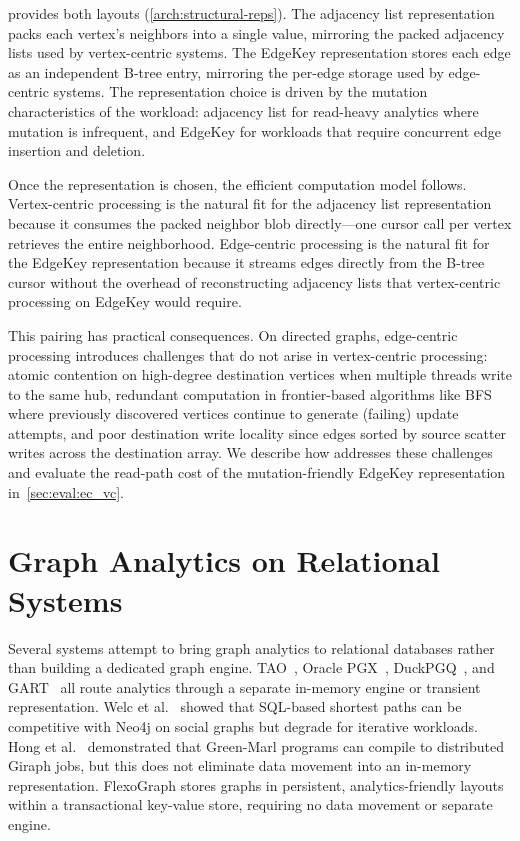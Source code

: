 \project{} provides both layouts (\autoref{arch:structural-reps}).
The adjacency list representation packs each vertex's neighbors into a single \wt{} value, mirroring the packed adjacency lists used by vertex-centric systems.
The EdgeKey representation stores each edge as an independent B-tree entry, mirroring the per-edge storage used by edge-centric systems.
The representation choice is driven by the mutation characteristics of the workload: adjacency list for read-heavy analytics where mutation is infrequent, and EdgeKey for workloads that require concurrent edge insertion and deletion.

Once the representation is chosen, the efficient computation model follows.
Vertex-centric processing is the natural fit for the adjacency list representation because it consumes the packed neighbor blob directly---one cursor call per vertex retrieves the entire neighborhood.
Edge-centric processing is the natural fit for the EdgeKey representation because it streams edges directly from the B-tree cursor without the overhead of reconstructing adjacency lists that vertex-centric processing on EdgeKey would require.

This pairing has practical consequences.
On directed graphs, edge-centric processing introduces challenges that do not arise in vertex-centric processing: atomic contention on high-degree destination vertices when multiple threads write to the same hub, redundant computation in frontier-based algorithms like BFS where previously discovered vertices continue to generate (failing) update attempts, and poor destination write locality since edges sorted by source scatter writes across the destination array.
We describe how \project{} addresses these challenges and evaluate the read-path cost of the mutation-friendly EdgeKey representation in~\autoref{sec:eval:ec_vc}.

\section{Graph Analytics on Relational Systems}
\label{design:relational_analytics}
Several systems attempt to bring graph analytics to relational databases rather than building a dedicated graph engine.
TAO~\cite{bronson2013tao}, Oracle PGX~\cite{hong2015pgx,OraclePG,WhatIsOracleSpatialGraph:online}, DuckPGQ~\cite{duckpgq:online}, and GART~\cite{shen2023bridging} all route analytics through a separate in-memory engine or transient representation.
Welc et al.~\cite{welc2013graph,graphProcessingRDBMS} showed that SQL-based shortest paths can be competitive with Neo4j on social graphs but degrade for iterative workloads.
Hong et al.~\cite{hong2013early} demonstrated that Green-Marl programs can compile to distributed Giraph jobs, but this does not eliminate data movement into an in-memory representation.
FlexoGraph stores graphs in persistent, analytics-friendly layouts within a transactional key-value store, requiring no data movement or separate engine.

